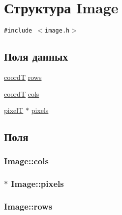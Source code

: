 \hypertarget{struct_image}{
\section{Структура Image}
\label{struct_image}
}
{\tt \#include $<$image.h$>$}

\subsection*{Поля данных}
\begin{CompactItemize}
\item 
\hyperlink{walsh__hadamard__run_2pm_2whimport_8h_f75219364b309824eef21d65e9edc43d}{coordT} \hyperlink{struct_image_4a618c18ca804c04077fa256e3d2f381}{rows}
\item 
\hyperlink{walsh__hadamard__run_2pm_2whimport_8h_f75219364b309824eef21d65e9edc43d}{coordT} \hyperlink{struct_image_e2425cb7fab5262196cb76e5929bb5dc}{cols}
\item 
\hyperlink{walsh__hadamard__run_2pm_2whimport_8h_54b1fd08a12b5c079874c56eb482c516}{pixelT} $\ast$ \hyperlink{struct_image_f5500233b42a09a7c8940399646accaf}{pixels}
\end{CompactItemize}


\subsection{Поля}
\hypertarget{struct_image_e2425cb7fab5262196cb76e5929bb5dc}{
\subsubsection[{cols}]{ {\bf Image::cols}}}
\label{struct_image_e2425cb7fab5262196cb76e5929bb5dc}


\hypertarget{struct_image_f5500233b42a09a7c8940399646accaf}{
\subsubsection[{pixels}]{ $\ast$ {\bf Image::pixels}}}
\label{struct_image_f5500233b42a09a7c8940399646accaf}


\hypertarget{struct_image_4a618c18ca804c04077fa256e3d2f381}{
\subsubsection[{rows}]{ {\bf Image::rows}}}
\label{struct_image_4a618c18ca804c04077fa256e3d2f381}




